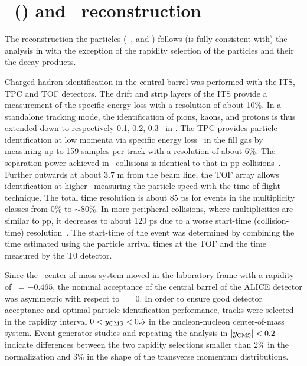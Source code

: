
\section{\lda\ (\alda) and \ks\ reconstruction}

The reconstruction the \Vzero particles (\ks\, \lda, and \alda) follows (is fully consistent with) the analysis in \cite{Abelev:2013haa} with the exception of the rapidity selection of the particles and their the decay products.


Charged-hadron identification in the central barrel was performed with
the ITS, TPC and TOF detectors. The drift and strip layers
of the ITS provide a measurement of the specific energy loss with a
resolution of about 10\%. In a standalone tracking mode, the
identification of pions, kaons, and protons is thus extended down to
respectively 0.1, 0.2, 0.3 \gevc\ in \pt. The TPC provides particle
identification at low momenta via specific energy loss \dedx\ in the
fill gas by measuring up to 159 samples per track with a resolution of
about 6\%. The separation power achieved in \pPb\ collisions is
identical to that in pp collisions~\cite{Abelev:2014ffa}. Further outwards at about 3.7 m
from the beam line, the TOF array allows identification at higher \pt\
measuring the particle speed with the time-of-flight technique. The
total time resolution is about 85 ps for events in the multiplicity
classes from 0\% to $\sim 80$\%.  In more peripheral collisions, where
multiplicities are similar to pp, it decreases to about 120 ps due to
a worse start-time (collision-time) resolution~\cite{Abelev:2014ffa}.
The start-time of the event was determined by combining the time estimated using the particle arrival
times at the TOF and the time measured by the T0 detector.

Since the \pPb\ center-of-mass system moved in the laboratory frame
with a rapidity of \ynn\ = $-0.465$, the nominal acceptance of the
central barrel of the ALICE detector was asymmetric with respect to
\ycms\ = 0.  In order to ensure good detector acceptance and optimal
particle identification performance, tracks were selected in the
rapidity interval $0 < y_{\rm CMS} < 0.5$ in the nucleon-nucleon
center-of-mass system. Event generator studies and repeating the
analysis in $\left|y_{\rm CMS}\right| < 0.2$ indicate differences between
the two rapidity selections smaller than 2\% in the
normalization and 3\% in the shape of the transverse momentum
distributions.

